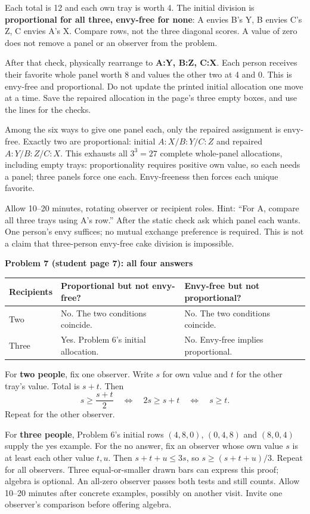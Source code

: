 \documentclass[11pt]{article}
\newcommand{\subhead}[1]{\par\vspace{1mm}\textbf{#1}\par}
\begin{document}
Each total is 12 and each own tray is worth 4. The initial division is \textbf{proportional for all three, envy-free for none}: A envies B's Y, B envies C's Z, C envies A's X. Compare rows, not the three diagonal scores. A value of zero does not remove a panel or an observer from the problem.

After that check, physically rearrange to \textbf{A:Y, B:Z, C:X}. Each person receives their favorite whole panel worth 8 and values the other two at 4 and 0. This is envy-free and proportional. Do not update the printed initial allocation one move at a time. Save the repaired allocation in the page's three empty boxes, and use the lines for the checks.

Among the six ways to give one panel each, only the repaired assignment is envy-free. Exactly two are proportional: initial $A:X/B:Y/C:Z$ and repaired $A:Y/B:Z/C:X$. This exhausts all $3^3=27$ complete whole-panel allocations, including empty trays: proportionality requires positive own value, so each needs a panel; three panels force one each. Envy-freeness then forces each unique favorite.

Allow 10--20 minutes, rotating observer or recipient roles. Hint: ``For A, compare all three trays using A's row.'' After the static check ask which panel each wants. One person's envy suffices; no mutual exchange preference is required. This is not a claim that three-person envy-free cake division is impossible.

\subhead{Problem 7 (student page 7): all four answers}
\begin{tabularx}{\linewidth}{@{}L{24mm}L{53mm}X@{}}\toprule
Recipients & Proportional but not envy-free? & Envy-free but not proportional?\\\midrule
Two & No. The two conditions coincide. & No. The two conditions coincide.\\
Three & Yes. Problem 6's initial allocation. & No. Envy-free implies proportional.\\\bottomrule
\end{tabularx}

For \textbf{two people}, fix one observer. Write $s$ for own value and $t$ for the other tray's value. Total is $s+t$. Then
\[
 s\ge\frac{s+t}{2}\quad\Longleftrightarrow\quad 2s\ge s+t
 \quad\Longleftrightarrow\quad s\ge t.
\]
Repeat for the other observer.

For \textbf{three people}, Problem 6's initial rows $(4,8,0)$, $(0,4,8)$ and $(8,0,4)$ supply the yes example. For the no answer, fix an observer whose own value $s$ is at least each other value $t,u$. Then $s+t+u\le3s$, so $s\ge(s+t+u)/3$. Repeat for all observers. Three equal-or-smaller drawn bars can express this proof; algebra is optional. An all-zero observer passes both tests and still counts. Allow 10--20 minutes after concrete examples, possibly on another visit. Invite one observer's comparison before offering algebra.
\end{document}
